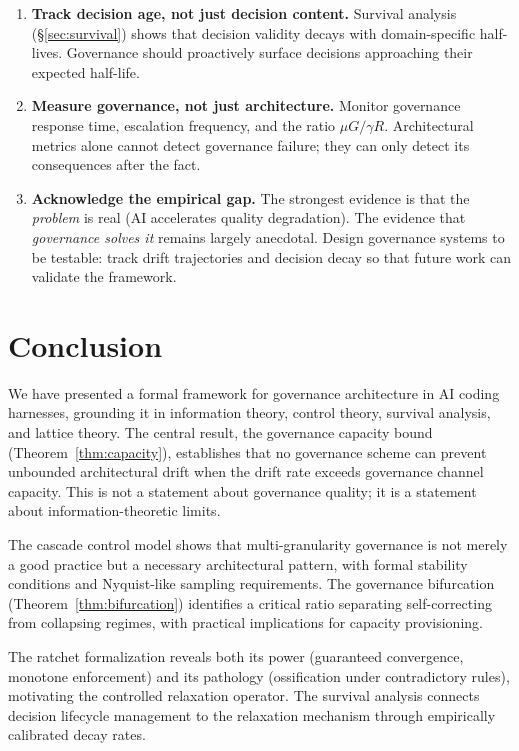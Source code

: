 \documentclass[11pt, a4paper, copyright]{googledeepmind}
\begin{document}
\begin{enumerate}
    \item \textbf{Track decision age, not just decision content.} Survival analysis (\S\ref{sec:survival}) shows that decision validity decays with domain-specific half-lives. Governance should proactively surface decisions approaching their expected half-life.

    \item \textbf{Measure governance, not just architecture.} Monitor governance response time, escalation frequency, and the ratio $\mu G / \gamma R$. Architectural metrics alone cannot detect governance failure; they can only detect its consequences after the fact.

    \item \textbf{Acknowledge the empirical gap.} The strongest evidence is that the \emph{problem} is real (AI accelerates quality degradation). The evidence that \emph{governance solves it} remains largely anecdotal. Design governance systems to be testable: track drift trajectories and decision decay so that future work can validate the framework.
\end{enumerate}


\section{Conclusion}
\label{sec:conclusion}

We have presented a formal framework for governance architecture in AI coding harnesses, grounding it in information theory, control theory, survival analysis, and lattice theory. The central result, the governance capacity bound (Theorem~\ref{thm:capacity}), establishes that no governance scheme can prevent unbounded architectural drift when the drift rate exceeds governance channel capacity. This is not a statement about governance quality; it is a statement about information-theoretic limits.

The cascade control model shows that multi-granularity governance is not merely a good practice but a necessary architectural pattern, with formal stability conditions and Nyquist-like sampling requirements. The governance bifurcation (Theorem~\ref{thm:bifurcation}) identifies a critical ratio separating self-correcting from collapsing regimes, with practical implications for capacity provisioning.

The ratchet formalization reveals both its power (guaranteed convergence, monotone enforcement) and its pathology (ossification under contradictory rules), motivating the controlled relaxation operator. The survival analysis connects decision lifecycle management to the relaxation mechanism through empirically calibrated decay rates.
\end{document}
